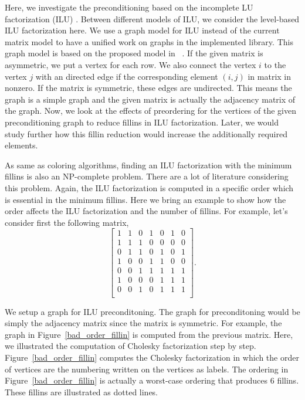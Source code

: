 \documentclass[12pt, oneside]{book}
\begin{document}
Here, we investigate the preconditioning based on the incomplete LU factorization (ILU) \cite{ilu2003}.
Between different models of ILU, we consider the level-based ILU factorization here.
We use a graph model for ILU instead of the current matrix model to have a unified
work on graphs in the implemented library. This graph model is based on the proposed
model in ~\cite{precond-pothen}. If the given matrix is asymmetric,
we put a vertex for each row. We also connect the vertex $i$ to the
vertex $j$ with an directed edge if the corresponding element $(i,j)$ in matrix
in nonzero. If the matrix is symmetric, these edges are undirected. This means
 the graph is a simple graph and the given matrix is actually the adjacency
matrix of the graph.
Now, we look at the effects of preordering for the vertices of the given preconditioning graph to reduce fillins in ILU factorization. Later, we would study further how this fillin reduction would increase the additionally required elements.

As same as coloring algorithms, finding an ILU factorization with the minimum
fillins is also an NP-complete problem. There are a lot of literature 
considering this problem\cite{ilu_ordering1,ilu_ordering2,ilu_ordering3,ilu_ordering4}. 
Again, the ILU factorization is computed in a specific order which is essential
in the minimum fillins. Here we bring an example to show how the order affects 
the ILU factorization and the number of fillins. 
For example, let's consider first the following matrix,
$$\begin{bmatrix}
 1 & 1 & 0 & 1 & 0 & 1 & 0\\
 1 & 1 & 1 & 0 & 0 & 0 & 0\\
 0 & 1 & 1 & 0 & 1 & 0 & 1\\
 1 & 0 & 0 & 1 & 1 & 0 & 0\\
 0 & 0 & 1 & 1 & 1 & 1 & 1\\
 1 & 0 & 0 & 0 & 1 & 1 & 1\\
 0 & 0 & 1 & 0 & 1 & 1 & 1\\
 \end{bmatrix}.$$

We setup a graph for ILU preconditoning.
The graph for preconditoning would be simply the adjacency matrix
since the matrix is symmetric. 
For example, the graph in Figure~\ref{bad_order_fillin}
is computed from the previous matrix. Here, we illustrated the
computation of Cholesky factorization step by step.
Figure~\ref{bad_order_fillin} computes the Cholesky factorization
in which the order of vertices are the numbering written on the vertices
as labels. The ordering in Figure~\ref{bad_order_fillin} is actually
 a worst-case ordering that produces $6$ fillins. These fillins are
illustrated as dotted lines.
\end{document}
